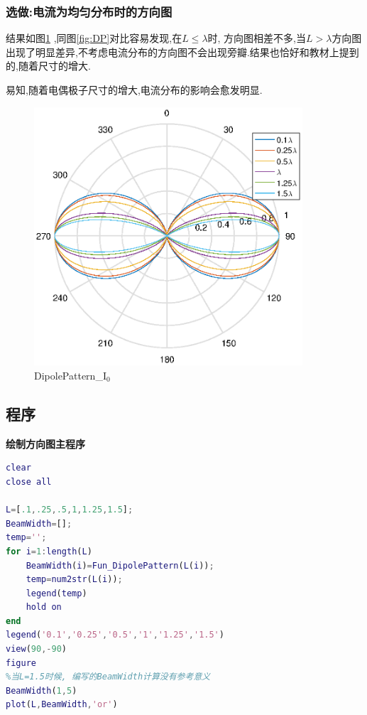 \subsubsection{选做:电流为均匀分布时的方向图}
结果如图\ref{fig:DP_i0} ,同图\ref{fig:DP}对比容易发现,在$L\le\lambda$时, 方向图相差不多,当$L>\lambda$方向图出现了明显差异,不考虑电流分布的方向图不会出现旁瓣.结果也恰好和教材上提到的,随着尺寸的增大.

易知,随着电偶极子尺寸的增大,电流分布的影响会愈发明显.
\begin{figure}[!ht]
	\centering
	\includegraphics[width=10cm]{DipolePattern_i0junyun.eps}
	\caption{DipolePattern\_$\mathrm{I_0}$} \label{fig:DP_i0}
\end{figure}







\subsection{程序}
\noindent \textbf{绘制方向图主程序}
\begin{lstlisting}[language={matlab},keywordstyle=\color{blue!70},commentstyle=\color{red!50!green!50!blue!50},frame=shadowbox, rulesepcolor=\color{red!20!green!20!blue!20}] 
clear
close all

L=[.1,.25,.5,1,1.25,1.5];
BeamWidth=[];
temp='';
for i=1:length(L)
    BeamWidth(i)=Fun_DipolePattern(L(i));
    temp=num2str(L(i));
    legend(temp)   
    hold on 
end
legend('0.1','0.25','0.5','1','1.25','1.5')
view(90,-90)
figure
%当L=1.5时候, 编写的BeamWidth计算没有参考意义
BeamWidth(1,5)
plot(L,BeamWidth,'or')

\end{lstlisting}

